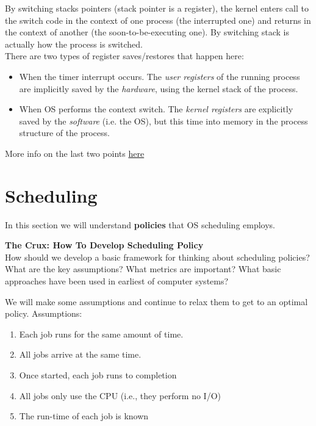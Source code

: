 By switching stacks pointers (stack pointer is a register),
the kernel enters call to the switch code in the 
context of one process (the interrupted one) and returns in the context of
another (the soon-to-be-executing one). By switching stack is actually how the
process is switched.\\

There are two types of register saves/restores that happen here:

\begin{itemize}
    \item When the timer interrupt occurs. The \textit{user registers} of the
        running process are implicitly saved by the \textit{hardware}, using
        the kernel stack of the process.
    \item When OS performs the context switch. The \textit{kernel registers} 
        are explicitly saved by the \textit{software} (i.e. the OS), but this
        time into memory in the process structure of the process.
\end{itemize}

More info on the last two points \href{https://cs.stackexchange.com/questions/96550/whats-the-difference-between-user-registers-and-kernel-registers}{here}

\section{Scheduling}

In this section we will understand \textbf{policies} that OS scheduling
employs.\\

\begin{tcolorbox}
    \textbf{The Crux: How To Develop Scheduling Policy}\\

    How should we develop a basic framework for thinking about scheduling
    policies? What are the key assumptions? What metrics are important? What
    basic approaches have been used in earliest of computer systems?
\end{tcolorbox}

We will make some assumptions and continue to relax them to get to an optimal
policy. Assumptions:

\begin{enumerate}
    \item Each job runs for the same amount of time.
    \item All jobs arrive at the same time.
    \item Once started, each job runs to completion
    \item All jobs only use the CPU (i.e., they perform no I/O)
    \item The run-time of each job is known
\end{enumerate}

